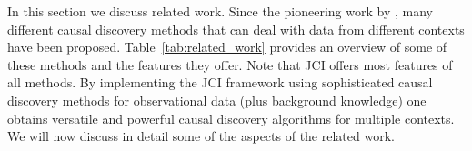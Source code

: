 \documentclass[twoside,11pt]{article}
\newcommand{\Joris}[1]{{\color{blue}#1}}
\newcommand{\Sara}[1]{{\color{purple}#1}}
\begin{document}
In this section we discuss related work. 
Since the pioneering work by \citet{Fisher1935}, many different causal discovery methods that can deal with data from different
contexts have been proposed. Table~\ref{tab:related_work} provides an overview of some of these methods and the features 
they offer. Note that JCI offers most features of all methods. 
By implementing the JCI framework using sophisticated causal discovery methods for observational data (plus background knowledge)
one obtains versatile and powerful causal discovery algorithms for multiple contexts. We will now discuss in detail some of
the aspects of the related work.
\end{document}
